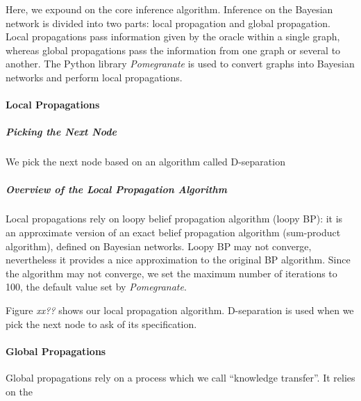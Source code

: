 Here, we expound on the core inference algorithm. Inference on the Bayesian
network is divided into two parts: local propagation and global propagation.
Local propagations pass information given by the oracle within a single graph,
whereas global propagations pass the information from one graph or several to
another. The Python library \emph{Pomegranate} is used to convert graphs into
Bayesian networks and perform local propagations.   %

\paragraph{Local Propagations}

\subparagraph{Picking the Next Node}

We pick the next node based on an algorithm called D-separation 

\subparagraph{Overview of the Local Propagation Algorithm}

Local propagations rely on loopy belief propagation algorithm (loopy BP): it is an
approximate version of an exact belief propagation algorithm (sum-product
algorithm), defined on Bayesian networks. Loopy BP may not converge,
nevertheless it provides a nice approximation to the original BP algorithm.
Since the algorithm may not converge, we set the maximum number of iterations to
100, the default value set by \emph{Pomegranate}.



Figure \emph{xx??} shows our local propagation algorithm. D-separation is used
when we pick the next node to ask of its specification. 


\paragraph{Global Propagations}

Global propagations rely on a process which we call ``knowledge transfer''. It
relies on the 